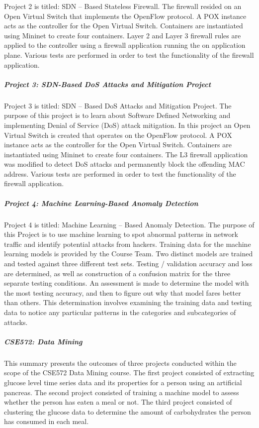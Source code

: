 Project 2 is titled: SDN -- Based Stateless Firewall.  The firewall resided on an Open Virtual Switch that implements the OpenFlow protocol.  A POX instance acts as the controller for the Open Virtual Switch.  Containers are instantiated using Mininet to create four containers.  Layer 2 and Layer 3 firewall rules are applied to the controller using a firewall application running the on application plane.  Various tests are performed in order to test the functionality of the firewall application.

\subparagraph{Project 3: SDN-Based DoS Attacks and Mitigation Project}

Project 3  is titled: SDN -- Based DoS Attacks and Mitigation Project.  The purpose of this project is to learn about Software Defined Networking and implementing Denial of Service (DoS) attack mitigation.  In this project an Open Virtual Switch is created that operates on the OpenFlow protocol.  A POX instance acts as the controller for the Open Virtual Switch.  Containers are instantiated using Mininet to create four containers.  The L3 firewall application was modified to detect DoS attacks and permanently block the offending MAC address.  Various tests are performed in order to test the functionality of the firewall application.

\subparagraph{Project 4: Machine Learning-Based Anomaly Detection}

Project 4 is titled: Machine Learning -- Based Anomaly Detection.  The purpose of this Project is to use machine learning to spot abnormal patterns in network traffic and identify potential attacks from hackers.  Training data for the machine learning models is provided by the Course Team.  Two distinct models are trained and tested against three different test sets.  Testing / validation accuracy and loss are determined, as well as construction of a confusion matrix for the three separate testing conditions.  An assessment is made to determine the model with the most testing accuracy, and then to figure out why that model fares better than others.  This determination involves examining the training data and testing data to notice any particular patterns in the categories and subcategories of attacks.

\subparagraph{CSE572: Data Mining}

This summary presents the outcomes of three projects conducted within the scope of the CSE572 Data Mining course.  The first project consisted of extracting glucose level time series data and its properties for a person using an artificial pancreas.  The second project consisted of training a machine model to assess whether the person has eaten a meal or not.  The third project consisted of clustering the glucose data to determine the amount of carbohydrates the person has consumed in each meal.

